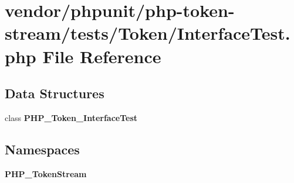 \section{vendor/phpunit/php-\/token-\/stream/tests/\+Token/\+Interface\+Test.php File Reference}
\label{phpunit_2php-token-stream_2tests_2_token_2_interface_test_8php}
\subsection*{Data Structures}
\begin{DoxyCompactItemize}
\item 
class {\bf P\+H\+P\+\_\+\+Token\+\_\+\+Interface\+Test}
\end{DoxyCompactItemize}
\subsection*{Namespaces}
\begin{DoxyCompactItemize}
\item 
 {\bf P\+H\+P\+\_\+\+Token\+Stream}
\end{DoxyCompactItemize}
